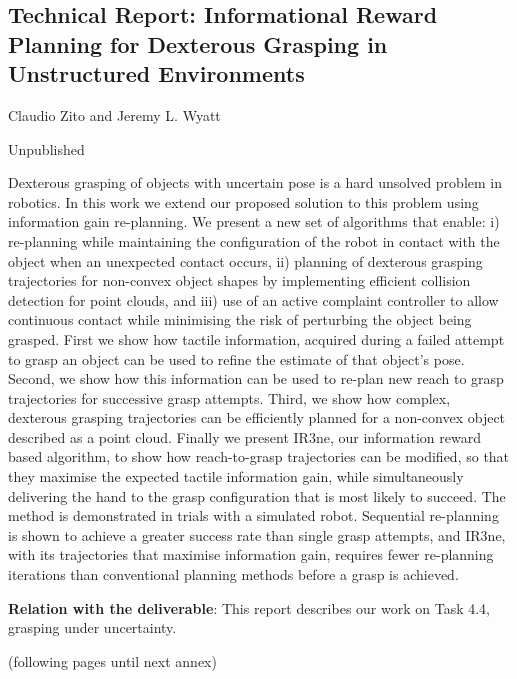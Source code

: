 \documentclass[a4paper,11pt,pdf]{pacmanreport}
\begin{document}
\subsection{Technical Report: Informational Reward Planning for
Dexterous Grasping in Unstructured Environments} \label{ann:uncertaintyGrasps}
\begin{description}
     \item[Authors] Claudio Zito and Jeremy L. Wyatt
      \item[Info] Unpublished
      \item[Abstract]  Dexterous grasping of objects with uncertain pose is a hard unsolved problem in robotics. In this work we extend our proposed solution to this problem using information gain re-planning. We present a new set of algorithms that enable: i) re-planning while maintaining the configuration of the robot in contact with the object when an unexpected contact occurs, ii) planning of dexterous grasping trajectories for non-convex object shapes by implementing efficient collision detection for point clouds, and iii) use of an active complaint controller to allow continuous contact while minimising the risk of perturbing the object being grasped. First we show how tactile information, acquired during a failed attempt to grasp an object can be used to refine the estimate of that object’s pose. Second, we show how this information can be used to re-plan new reach to grasp trajectories for successive grasp attempts. Third, we show how complex, dexterous grasping trajectories can be efficiently planned for a non-convex object described as a point cloud. Finally we present IR3ne, our information reward based algorithm, to show how reach-to-grasp trajectories can be modified, so that they maximise the expected tactile information gain, while simultaneously delivering the hand to the grasp configuration that is most likely to succeed. The method is demonstrated in trials with a simulated robot. Sequential re-planning is shown to achieve a greater success rate than single grasp attempts, and IR3ne, with its trajectories that maximise information gain, requires fewer re-planning iterations than conventional planning methods before a grasp is achieved.
     \item \textbf{Relation with the deliverable}: This report describes our work on Task 4.4, grasping under uncertainty.
     \item[Attachment] (following pages until next annex)
 \end{description}

\end{document}
